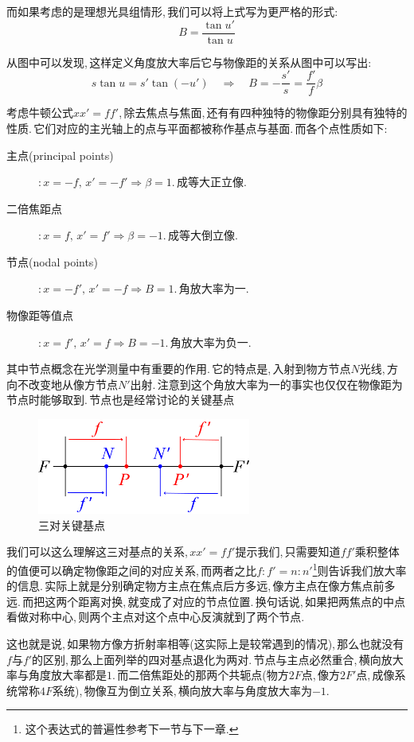 而如果考虑的是理想光具组情形,\,我们可以将上式写为更严格的形式:
\[B=\frac{\tan u'}{\tan u}\]

从图中可以发现,\,这样定义角度放大率后它与物像距的关系从图中可以写出:
\[s\tan u=s'\tan (-u')\quad\Rightarrow\quad B=-\frac{s'}{s}=\frac{f'}{f}\beta\]

考虑牛顿公式\(xx'=ff'\),\,除去焦点与焦面,\,还有有四种独特的物像距分别具有独特的性质.\,它们对应的主光轴上的点与平面都被称作基点与基面.\,而各个点性质如下:

\begin{description}
	\item[\hei 主点(principal points)]:\,\(x=-f,\,x'=-f'\Rightarrow\beta=1\).\,成等大正立像.
	\item[\hei 二倍焦距点]:\,\(x=f,\,x'=f'\Rightarrow\beta=-1\).\,成等大倒立像.
	\item[\hei 节点(nodal points)]:\,\(x=-f',\,x'=-f\Rightarrow B=1\).\,角放大率为一.
	\item[\hei 物像距等值点]:\,\(x=f',\,x'=f\Rightarrow B=-1\).\,角放大率为负一.
\end{description}

其中节点概念在光学测量中有重要的作用.\,它的特点是,\,入射到物方节点\(N\)光线,\,方向不改变地从像方节点\(N'\)出射.\,注意到这个角放大率为一的事实也仅仅在物像距为节点时能够取到.\,节点也是经常讨论的关键基点

\begin{figure}
\centering
\vspace{0cm}
\includegraphics[width=7cm]{image/5-7-10.png}
\caption{三对关键基点}
\end{figure}
我们可以这么理解这三对基点的关系,\,\(xx'=ff'\)提示我们,\,只需要知道\(ff'\)乘积整体的值便可以确定物像距之间的对应关系,\,而两者之比\(f:f'=n:n'\)\footnote{这个表达式的普遍性参考下一节与下一章.}则告诉我们放大率的信息.\,实际上就是分别确定物方主点在焦点后方多远,\,像方主点在像方焦点前多远.\,而把这两个距离对换,\,就变成了对应的节点位置.\,换句话说,\,如果把两焦点的中点看做对称中心,\,则两个主点对这个点中心反演就到了两个节点.

这也就是说,\,如果物方像方折射率相等(这实际上是较常遇到的情况),\,那么也就没有\(f\)与\(f'\)的区别,\,那么上面列举的四对基点退化为两对.\,节点与主点必然重合,\,横向放大率与角度放大率都是\(1\).\,而二倍焦距处的那两个共轭点(物方\(2F\)点,\,像方\(2F'\)点,\,成像系统常称\(4F\)系统),\,物像互为倒立关系,\,横向放大率与角度放大率为\(-1\).

